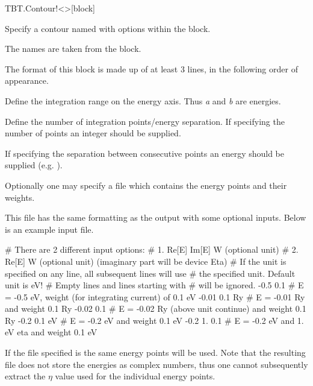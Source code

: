 \begin{fdfentry}{TBT.Contour!<>}[block]

  Specify a contour named \fdf*{<>} with options within the block.

  The names \fdf*{<>} are taken from the  block.

  The format of this block is made up of at least $3$ lines, in the
  following order of appearance.

  \begin{fdfoptions}


    Define the integration range on the energy axis.
    Thus \emph{a} and \emph{b} are energies.



    Define the number of integration points/energy separation.
    If specifying the number of points an integer should be supplied.

    If specifying the separation between consecutive points an energy
    should be supplied (e.g. ).

    Optionally one may specify a file which contains the energy points
    and their weights.

    This file has the same formatting as the  output
    with some optional inputs. Below is an example input file.
    \begin{shellexample}
# There are 2 different input options:
# 1. Re[E] Im[E] W  (optional unit)
# 2. Re[E] W        (optional unit) (imaginary part will be device Eta)
# If the unit is specified on any line, all subsequent lines will use
# the specified unit. Default unit is eV!
# Empty lines and lines starting with # will be ignored.
-0.5  0.1    # E = -0.5 eV, weight (for integrating current) of 0.1 eV
-0.01 0.1 Ry # E = -0.01 Ry and weight 0.1 Ry
-0.02 0.1    # E = -0.02 Ry (above unit continue) and weight 0.1 Ry
-0.2  0.1 eV # E = -0.2 eV and weight 0.1 eV
-0.2 1. 0.1  # E = -0.2 eV and 1. eV eta and weight 0.1 eV
\end{shellexample}

    If the file specified is  the same energy points
    will be used. Note that the resulting  file does
    not store the energies as complex numbers, thus one cannot
    subsequently extract the $\eta$ value used for the individual
    energy points.


\end{fdfoptions}
\end{fdfentry}
